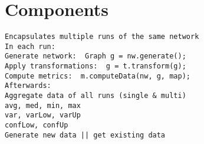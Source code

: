 
\section{Components}
\label{sec:components}




\begin{verbatim}
Encapsulates multiple runs of the same network
In each run:
Generate network:  Graph g = nw.generate();
Apply transformations:  g = t.transform(g);
Compute metrics:  m.computeData(nw, g, map);
Afterwards:
Aggregate data of all runs (single & multi)
avg, med, min, max
var, varLow, varUp
confLow, confUp
Generate new data || get existing data
\end{verbatim}


